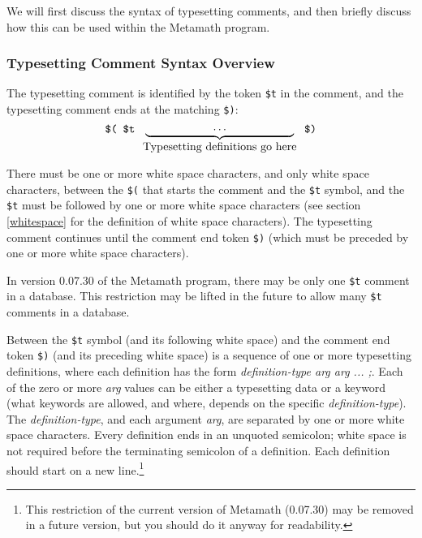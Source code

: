We will first discuss the syntax of typesetting comments, and then
briefly discuss how this can be used within the Metamath program.

\subsubsection{Typesetting Comment Syntax Overview}

The typesetting comment is identified by the token
\texttt{\$t} in
the comment, and the typesetting comment ends at the matching
\texttt{\$)}:
\[
  \mbox{\tt \$(\ }
  \mbox{\tt \$t\ }
  \underbrace{
    \mbox{\tt \ \ \ \ \ \ \ \ \ \ \ }
    \cdots
    \mbox{\tt \ \ \ \ \ \ \ \ \ \ \ }
  }_{\mbox{Typesetting definitions go here}}
  \mbox{\tt \ \$)}
\]

There must be one or more white space characters, and only white space
characters, between the \texttt{\$(} that starts the comment
and the \texttt{\$t} symbol,
and the \texttt{\$t} must be followed by one
or more white space characters
(see section \ref{whitespace} for the definition of white space characters).
The typesetting comment continues until the comment end token \texttt{\$)}
(which must be preceded by one or more white space characters).

In version 0.07.30 of the
Metamath program, there may be only one \texttt{\$t} comment in a
database.  This restriction may be lifted in the future to allow
many \texttt{\$t} comments in a database.

Between the \texttt{\$t} symbol (and its following white space) and the
comment end token \texttt{\$)} (and its preceding white space)
is a sequence of one or more typesetting definitions, where
each definition has the form
\textit{definition-type arg arg ... ;}.
Each of the zero or more \textit{arg} values
can be either a typesetting data or a keyword
(what keywords are allowed, and where, depends on the specific
\textit{definition-type}).
The \textit{definition-type}, and each argument \textit{arg},
are separated by one or more white space characters.
Every definition ends in an unquoted semicolon;
white space is not required before the terminating semicolon of a definition.
Each definition should start on a new line.\footnote{This
restriction of the current version of Metamath
(0.07.30) may be removed
in a future version, but you should do it anyway for readability.}

